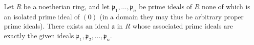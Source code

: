 Let $R$ be a noetherian ring, and let $\mathfrak{p}_1, \dots, \mathfrak{p}_n$ be prime ideals of $R$ none of which is an isolated prime ideal of $(0)$ (in a domain they may thus be arbitrary proper prime ideals). There exists an ideal $\mathfrak{a}$ in $R$ whose associated prime ideals are exactly the given ideals $\mathfrak{p}_1, \mathfrak{p}_2, \dots, \mathfrak{p}_n$.
